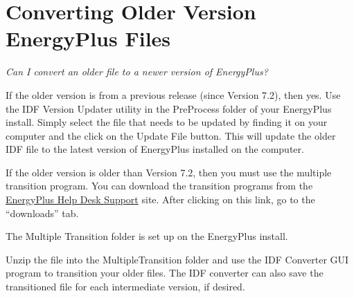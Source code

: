 \section{Converting Older Version EnergyPlus Files}\label{converting-older-version-energyplus-files}

\emph{Can I convert an older file to a newer version of EnergyPlus?}

If the older version is from a previous release (since Version 7.2), then yes.  Use the IDF Version Updater utility in the PreProcess folder of your EnergyPlus install.  Simply select the file that needs to be updated by finding it on your computer and the click on the Update File button. This will update the older IDF file to the latest version of EnergyPlus installed on the computer.

If the older version is older than Version 7.2, then you must use the multiple transition program. You can download the transition programs from the \href{http://energyplus.helpserve.com}{EnergyPlus Help Desk Support} site.  After clicking on this link, go to the ``downloads'' tab.

The Multiple Transition folder is set up on the EnergyPlus install.

Unzip the file into the MultipleTransition folder and use the IDF Converter GUI program to transition your older files. The IDF converter can also save the transitioned file for each intermediate version, if desired.
